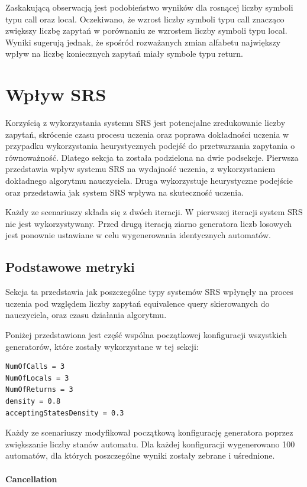 Zaskakującą obserwacją jest podobieństwo wyników dla rosnącej liczby symboli typu
call oraz local. Oczekiwano, że wzrost liczby symboli typu call znacząco zwiększy
liczbę zapytań w porównaniu ze wzrostem liczby symboli typu local.
Wyniki sugerują jednak, że spośród rozważanych zmian alfabetu największy wpływ
na liczbę koniecznych zapytań miały symbole typu return.

\section{Wpływ SRS}

Korzyścią z wykorzystania systemu SRS jest potencjalne zredukowanie liczby zapytań,
skrócenie czasu procesu uczenia oraz poprawa dokładności uczenia w przypadku wykorzystania
heurystycznych podejść do przetwarzania zapytania o równoważność. Dlatego sekcja ta została
podzielona na dwie podsekcje. Pierwsza przedstawia wpływ systemu SRS na wydajność uczenia,
z wykorzystaniem dokładnego algorytmu nauczyciela. Druga wykorzystuje heurystyczne podejście
oraz przedstawia jak system SRS wpływa na skuteczność uczenia.

Każdy ze scenariuszy składa się z dwóch iteracji. W pierwszej iteracji system SRS nie jest wykorzystywany.
Przed drugą iteracją ziarno generatora liczb losowych jest ponownie ustawiane w celu wygenerowania
identycznych automatów.

\subsection{Podstawowe metryki}
\label{chap:baseMetrics}

Sekcja ta przedstawia jak poszczególne typy systemów SRS wpłynęły na proces uczenia pod względem liczby zapytań
equivalence query skierowanych do nauczyciela, oraz czasu działania algorytmu.

Poniżej przedstawiona jest część wspólna początkowej konfiguracji wszystkich
generatorów, które zostały wykorzystane w tej sekcji:
\begin{verbatim}
NumOfCalls = 3
NumOfLocals = 3
NumOfReturns = 3
density = 0.8
acceptingStatesDensity = 0.3
\end{verbatim}

Każdy ze scenariuszy modyfikował początkową konfigurację generatora poprzez zwiększanie liczby stanów automatu.
Dla każdej konfiguracji wygenerowano 100 automatów, dla których poszczególne wyniki zostały zebrane i uśrednione.

\paragraph{Cancellation}

